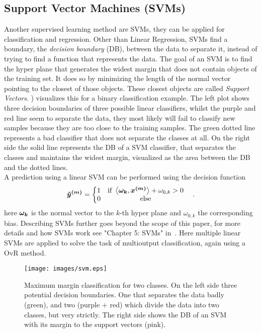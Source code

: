 \subsection{Support Vector Machines (SVMs)}\label{subsec:support-vector-machines}
Another supervised learning method are SVMs, they can be applied for classification and regression.
Other than Linear Regression, SVMs find a boundary, the \textit{decision boundary} (DB), between the data to separate it, instead of trying to find a function that represents the data.
The goal of an SVM is to find the hyper plane that generates the widest margin that does not contain objects of the training set.
It does so by minimizing the length of the normal vector pointing to the closest of those objects.
These closest objects are called \textit{Support Vectors}.
) visualizes this for a binary classification example.
The left plot shows three decision boundaries of three possible linear classifiers, whilst the purple and red line seem to separate the data, they most likely will fail to classify new samples because they are too close to the training samples.
The green dotted line represents a bad classifier that does not separate the classes at all.
On the right side the solid line represents the DB of a SVM classifier, that separates the classes and maintains the widest margin, visualized as the area between the DB and the dotted lines.\\
A prediction using a linear SVM can be performed using the decision function
\begin{align}
    \bm{\hat{y}^{(m)}} = \left\{
    \begin{matrix}
        1 & \text{if } \left\langle\bm{\omega_k},\bm{x^{(m)}}\right\rangle+\omega_{0,k} > 0\\
        0 & \text{else}
    \end{matrix}\right. \quad .
\end{align}
here $\bm{\omega_k}$ is the normal vector to the $k$-th hyper plane and $\omega_{0,k}$ the corresponding bias.
Describing SVMs further goes beyond the scope of this paper, for more details and how SVMs work see "Chapter 5: SVMs" in~\cite{handsOn}.
Here multiple linear SVMs are applied to solve the task of multioutput classification, again using a OvR method.
\begin{figure}
    \centering
    \texttt{[image: images/svm.eps]}
    \caption{
    \footnotemark
        Maximum margin classification for two classes.
        On the left side three potential decision boundaries.
        One that separates the data badly (green), and two (purple + red) which divide the data into two classes, but very strictly. The right side shows the DB of an SVM with its margin to the support vectors (pink).
    }
    \label{fig:svm}
\end{figure}
